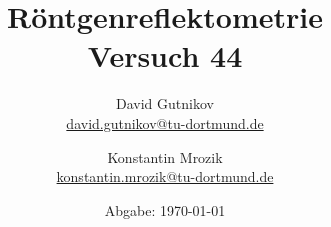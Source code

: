 

\title{Röntgenreflektometrie\\
\small{Versuch 44}}
\author{%
  David Gutnikov\\%
  \href{mailto:david.gutnikov@tu-dortmund.de}{david.gutnikov@tu-dortmund.de} \and
  Konstantin Mrozik\\
  \href{mailto:konstantin.mrozik@tu-dortmund.de}{konstantin.mrozik@tu-dortmund.de}%
}
\date{
  Abgabe: \today
}
\publishers{TU Dortmund - Fakultät Physik}
\makeatletter         
\def\@maketitle{
\raggedright
\texttt{[image: bilder/lo\_TU-Do\_2008/logo\_rgb\_jpg/tud\_logo\_rgb.jpg]}\\[8ex]
\begin{center}
{\Huge \bfseries \sffamily \@title }\\[4ex] 
{\Large  \@author}\\[4ex] 
\@date\\[8ex]
\publishers\\
\end{center}}
\makeatother





\maketitle
\thispagestyle{empty}
\tableofcontents
\newpage




\newpage
\nocite{*}
\printbibliography


